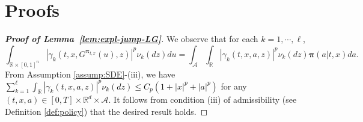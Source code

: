 \documentclass[11pt]{article}
\newcommand{\1}{\mathbbm{1}}
\newcommand{\bpi}{\boldsymbol{\pi}}
\newcommand{\rev}[1]{\textcolor{black}{{#1}}} %
\begin{document}



\appendix

\section{Proofs}\label{appendix:proofs}

\begin{proof}[\bf Proof of Lemma~\ref{lem:expl-jump-LG}]
	We observe that for each $k=1,\cdots,\ell$,
	\begin{equation}
		\int_{\mathbb{R}\times[0,1]^n}\left|\gamma_k\left(t,x,G^{\bpi_{t,x}}(u),z\right)\right|^p\nu_k(dz)du = \int_{\mathcal{A}}\int_{\mathbb{R}}|\gamma_k(t,x,a,z)|^p\nu_k(dz)\bpi(a|t,x)da.
	\end{equation}
	From Assumption \ref{assump:SDE}-(iii), we have \rev{$\sum_{k=1}^\ell \int_{\mathbb{R}}|\gamma_k(t,x,a,z)|^p\nu_k(dz)\le C_p(1+|x|^p+|a|^p)$} for any $(t, x, a) \in[0, T] \times \mathbb{R}^d \times \mathcal{A}$. It follows from condition (iii) of admissibility (see Definition \ref{def:policy}) that the desired result holds.
\end{proof}

\end{document}
